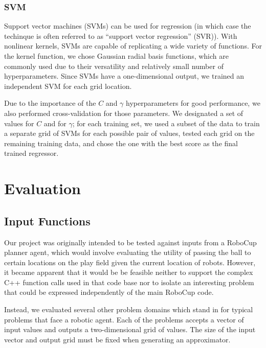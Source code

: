 \documentclass{article}
\begin{document}
\subsubsection{SVM}

Support vector machines (SVMs) can be used for regression (in which case the techinque is often referred to as ``support vector regression'' (SVR)). With nonlinear kernels, SVMs are capable of replicating a wide variety of functions. For the kernel function, we chose Gaussian radial basis functions, which are commonly used due to their versatility and relatively small number of hyperparameters. Since SVMs have a one-dimensional output, we trained an independent SVM for each grid location.

Due to the importance of the $C$ and $\gamma$ hyperparameters for good performance, we also performed cross-validation for those parameters. We designated a set of values for $C$ and for $\gamma$; for each training set, we used a subset of the data to train a separate grid of SVMs for each possible pair of values, tested each grid on the remaining training data, and chose the one with the best score as the final trained regressor.

\section{Evaluation}

\subsection{Input Functions}

Our project was originally intended to be tested against inputs from a RoboCup planner agent, which would involve evaluating the utility of passing the ball to certain locations on the play field given the current location of robots. However, it became apparent that it would be be feasible neither to support the complex C++ function calls used in that code base nor to isolate an interesting problem that could be expressed independently of the main RoboCup code.

Instead, we evaluated several other problem domains which stand in for typical problems that face a robotic agent. Each of the problems accepts a vector of input values and outputs a two-dimensional grid of values. The size of the input vector and output grid must be fixed when generating an approximator.
\end{document}
